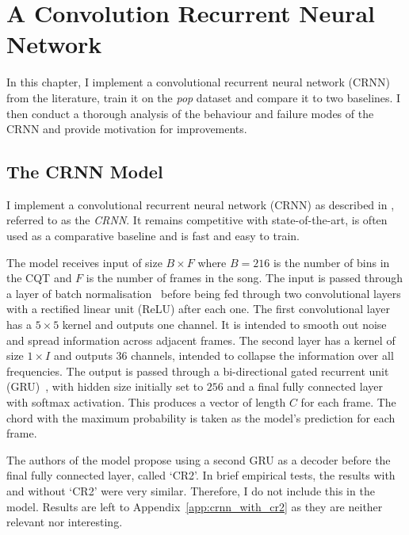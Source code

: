\chapter{A Convolution Recurrent Neural Network}\label{chap:crnn}

In this chapter, I implement a convolutional recurrent neural network (CRNN) from the literature, train it on the \emph{pop} dataset and compare it to two baselines. I then conduct a thorough analysis of the behaviour and failure modes of the CRNN and provide motivation for improvements. 

\section{The CRNN Model}\label{sec:crnn}

I implement a convolutional recurrent neural network (CRNN) as described in \citet{StructuredTraining}, referred to as the \emph{CRNN}. It remains competitive with state-of-the-art, is often used as a comparative baseline and is fast and easy to train.

The model receives input of size $B \times F$ where $B=216$ is the number of bins in the CQT and $F$ is the number of frames in the song. The input is passed through a layer of batch normalisation~\citep{BatchNorm} before being fed through two convolutional layers with a rectified linear unit (ReLU) after each one. The first convolutional layer has a $5\times 5$ kernel and outputs one channel. It is intended to smooth out noise and spread information across adjacent frames. The second layer has a kernel of size $1\times I$ and outputs 36 channels, intended to collapse the information over all frequencies. The output is passed through a bi-directional gated recurrent unit (GRU)~\citep{GRU}, with hidden size initially set to $256$ and a final fully connected layer with softmax activation. This produces a vector of length $C$ for each frame. The chord with the maximum probability is taken as the model's prediction for each frame.

The authors of the model propose using a second GRU as a decoder before the final fully connected layer, called `CR2'. In brief empirical tests, the results with and without `CR2' were very similar. Therefore, I do not include this in the model. Results are left to Appendix~\ref{app:crnn_with_cr2} as they are neither relevant nor interesting.


